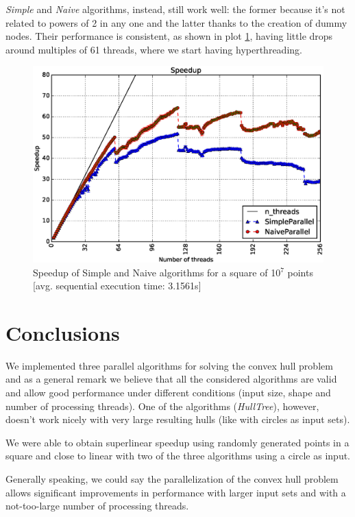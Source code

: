 \documentclass[letterpaper]{article}
\theoremstyle{definition}
\begin{document}
\textit{Simple} and \textit{Naive} algorithms, instead, still work well: the former because it's not related to powers of 2 in any one and the latter thanks to the creation of dummy nodes. Their performance is consistent, as shown in plot \ref{Speedup Total}, having little drops around multiples of 61 threads, where we start having hyperthreading.

\begin{figure}[!ht]\centering
  \includegraphics[scale=0.3]{./plots/total_speed.eps}
  \caption{Speedup of Simple and Naive algorithms for a square of 10$^7$ points [avg. sequential execution time: 3.1561s]\label{Speedup Total}}
\end{figure}

\section{Conclusions}

We implemented three parallel algorithms for solving the convex hull problem and as a general remark we believe that all the considered algorithms are valid and allow good performance under different conditions (input size, shape and number of processing threads).
One of the algorithms (\textit{HullTree}), however, doesn't work nicely with very large resulting hulls (like with circles as input sets).

We were able to obtain superlinear speedup using randomly generated points in a square and close to linear with two of the three algorithms using a circle as input.

Generally speaking, we could say the parallelization of the convex hull problem allows significant improvements in performance with larger input sets and with a not-too-large number of processing threads.
\end{document}
